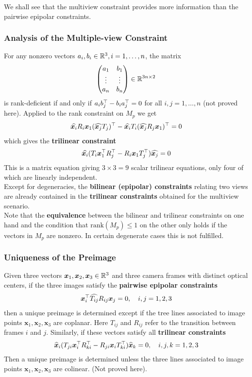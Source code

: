 We shall see that the multiview constraint provides more information
than the pairwise epipolar constraints.


\subsubsection*{Analysis of the Multiple-view Constraint}%
\label{ssub:analysis_of_the_multiple_view_constraint}

For any nonzero vectors $a_i, b_i \in \mathbb{R}^3, i = 1, \ldots, n$, the matrix
\[
	\begin{pmatrix}
		a_1 & b_1 \\
		\vdots & \vdots \\
		a_n & b_n
	\end{pmatrix}
	\in \mathbb{R}^{3n \times{} 2}
\]
is rank-deficient if and only if $a_i b_j^{\top} - b_i a_j^{\top} = 0$
for all $i,j = 1, \ldots, n$ (not proved here).
Applied to the rank constraint on $M_p$ we get
\[
	\widehat{\bm{x}_i} R_i \bm{x}_1 (\widehat{\bm{x}_j} T_j)^{\top} -
	\widehat{\bm{x}_i} T_i (\widehat{\bm{x}_j} R_j \bm{x}_1)^{\top} = 0
\]
which gives the \textbf{trilinear constraint}
\[
	\widehat{\bm{x}_i}
	(T_i \bm{x}_1^{\top} R_j^{\top} - R_i \bm{x}_1 T_j^{\top})
	\widehat{\bm{x}_j} = 0
\]
This is a matrix equation giving $3 \times 3 = 9$ scalar
trilinear equations, only four of which are linearly independent.\\

Except for degeneracies, the \textbf{bilinear (epipolar) constraints}
relating two views are already contained in the
\textbf{trilinear constraints} obtained for the multiview scenario.\\

Note that the \textbf{equivalence} between the bilinear and trilinear constraints
on one hand and the condition that $\text{rank}(M_p) \leq 1$ on the other
only holds if the vectors in $M_p$ are nonzero.
In certain degenerate cases this is not fulfilled.


\subsubsection*{Uniqueness of the Preimage}%
\label{ssub:uniqueness_of_the_preimage}


Given three vectors $\bm{x}_1, \bm{x}_2, \bm{x}_3 \in \mathbb{R}^3$
and three camera frames with distinct optical centers,
if the three images satisfy the \textbf{pairwise epipolar constraints}
\[
	\bm{x}_i^{\top} \widehat{T_{ij}} R_{ij} \bm{x}_j = 0,
	\quad i,j = 1,2,3
\]
then a unique preimage is determined except if the tree lines
associated to image points $\bm{x}_1, \bm{x}_2, \bm{x}_3$ are coplanar.
Here $T_{ij}$ and $R_{ij}$ refer to the transition between frames $i$ and $j$.
Similarly, if these vectors satisfy all \textbf{trilinear constraints}
\[
	\widehat{\bm{x}}_i
	( T_{ji} \bm{x}_i^{\top} R_{ki}^{\top} - R_{ji} \bm{x}_i T_{ki}^{\top} )
	\widehat{\bm{x}}_k = 0,
	\quad i,j,k = 1,2,3
\]
Then a unique preimage is determined unless the three lines
associated to image points $\bm{x}_1, \bm{x}_2, \bm{x}_3$ are colinear.
(Not proved here).


